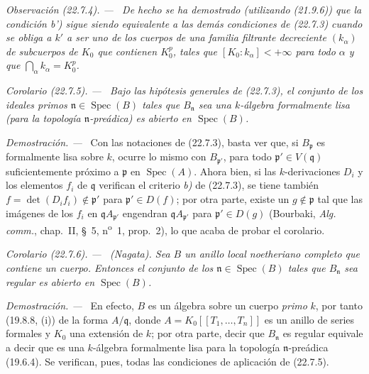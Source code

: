 \documentclass[10pt,oneside]{book}
\makeatletter
\newcommand{\setmanualcurrentlabel}[1]{\def\@currentlabel{#1}}
\newcommand{\oldpage}[2][]{%
  \setcounter{footnote}{0}%
  \marginpar{\scriptsize\textbf{#1}~|~#2}\ignorespaces}
\newenvironment{corollary}[1][]{%
  \setmanualcurrentlabel{#1}\par\medskip\noindent\itshape Corolario (#1). ---\ }{\par}
\newenvironment{remark}[1][]{%
  \setmanualcurrentlabel{#1}\par\medskip\noindent\itshape Observación (#1). ---\ }{\par}
\newenvironment{proof}{%
  \par\medskip\noindent\textit{Demostración. ---\ }}{\par}
\makeatother
\begin{document}
\oldpage[0\textsubscript{IV-1}]{213}

\begin{remark}[22.7.4]
\label{0.22.7.4-es}
De hecho se ha demostrado (utilizando (21.9.6)) que la condición \emph{b')} sigue siendo
equivalente a las demás condiciones de (22.7.3) cuando se obliga a $k'$ a
ser uno de los cuerpos de una familia filtrante decreciente $(k_\alpha)$ de
subcuerpos de $K_0$ que contienen $K_0^p$, tales que
$[K_0:k_\alpha]<+\infty$ para todo $\alpha$ y que
$\bigcap_\alpha k_\alpha=K_0^p$.
\end{remark}

\begin{corollary}[22.7.5]
\label{0.22.7.5-es}
Bajo las hipótesis generales de \textup{(22.7.3)}, el conjunto de los ideales primos
$\mathfrak n\in\operatorname{Spec}(B)$ tales que $B_{\mathfrak n}$ sea una
$k$-álgebra formalmente lisa (para la topología $\mathfrak n$-preádica)
es abierto en $\operatorname{Spec}(B)$.
\end{corollary}

\begin{proof}
Con las notaciones de (22.7.3), basta ver que, si $B_{\mathfrak p}$
es formalmente lisa sobre $k$, ocurre lo mismo con $B_{\mathfrak p'}$, para
todo $\mathfrak p'\in V(\mathfrak q)$ suficientemente próximo a $\mathfrak p$ en
$\operatorname{Spec}(A)$. Ahora bien, si las $k$-derivaciones $D_i$ y los elementos
$f_i$ de $\mathfrak q$ verifican el criterio \emph{b)} de (22.7.3), se tiene también
$f=\det(D_if_i)\notin\mathfrak p'$ para $\mathfrak p'\in D(f)$; por otra
parte, existe un $g\notin\mathfrak p$ tal que las imágenes de los $f_i$ en
$\mathfrak qA_{\mathfrak p'}$ engendran $\mathfrak qA_{\mathfrak p'}$ para
$\mathfrak p'\in D(g)$ (Bourbaki, \emph{Alg. comm.}, chap.~II, §~5,
n\textsuperscript{o}~1, prop.~2), lo que acaba de probar el corolario.
\end{proof}

\begin{corollary}[22.7.6]
\label{0.22.7.6-es}
\textnormal{(Nagata).} Sea $B$ un anillo local noetheriano completo que contiene
un cuerpo. Entonces el conjunto de los $\mathfrak n\in\operatorname{Spec}(B)$ tales
que $B_{\mathfrak n}$ sea regular es abierto en $\operatorname{Spec}(B)$.
\end{corollary}

\begin{proof}
En efecto, $B$ es un álgebra sobre un cuerpo \emph{primo} $k$, por tanto (19.8.8, (i))
de la forma $A/\mathfrak q$, donde
$A=K_0[[T_1,\ldots,T_n]]$ es un anillo de series formales y $K_0$ una
extensión de $k$; por otra parte, decir que $B_{\mathfrak n}$ es regular
equivale a decir que es una $k$-álgebra formalmente lisa para la topología
$\mathfrak n$-preádica (19.6.4). Se verifican, pues, todas las condiciones de aplicación de
(22.7.5).
\end{proof}
\end{document}
